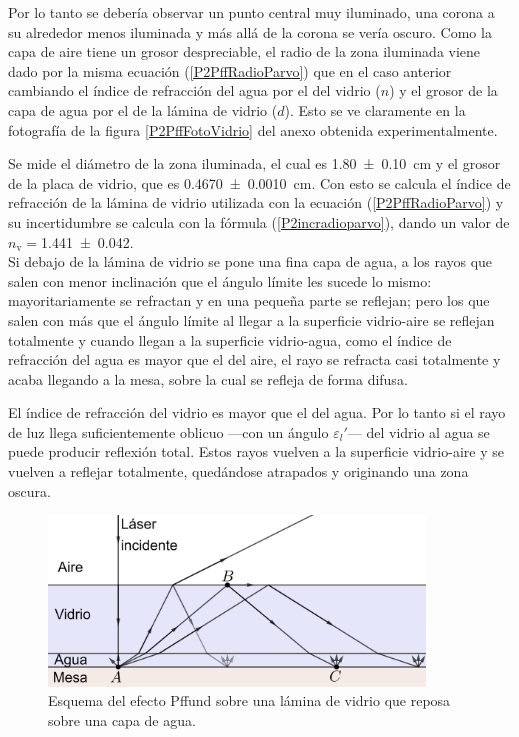 \documentclass[12pt]{article}
\numberwithin{table}{section}
\numberwithin{figure}{section}
\numberwithin{equation}{section}
\newcommand{\data}[3]{\SI{#1 \pm #2}{#3}}
\begin{document}
Por lo tanto se debería observar un punto central muy iluminado, una corona a su alrededor menos iluminada y más allá de la corona se vería oscuro. Como la capa de aire tiene un grosor despreciable, el radio de la zona iluminada viene dado por la misma ecuación (\ref{P2PffRadioParvo}) que en el caso anterior cambiando el índice de refracción del agua por el del vidrio ($n$) y el grosor de la capa de agua por el de la lámina de vidrio ($d$). Esto se ve claramente en la fotografía de la figura \ref{P2PffFotoVidrio} del anexo obtenida experimentalmente.

Se mide el diámetro de la zona iluminada, el cual es \data{1.80}{0.10}{cm} y el grosor de la placa de vidrio, que es \data{0.4670}{0.0010}{cm}. Con esto se calcula el índice de refracción de la lámina de vidrio utilizada con la ecuación (\ref{P2PffRadioParvo}) y su incertidumbre se calcula con la fórmula (\ref{P2incradioparvo}), dando un valor de $n_{\text{v}}=$\data{1.441}{0.042}{}.
\\

Si debajo de la lámina de vidrio se pone una fina capa de agua, a los rayos que salen con menor inclinación que el ángulo límite les sucede lo mismo: mayoritariamente se refractan y en una pequeña parte se reflejan; pero los que salen con más que el ángulo límite al llegar a la superficie vidrio-aire se reflejan totalmente y cuando llegan a la superficie vidrio-agua, como el índice de refracción del agua es mayor que el del aire, el rayo se refracta casi totalmente y acaba llegando a la mesa, sobre la cual se refleja de forma difusa.

El índice de refracción del vidrio es mayor que el del agua. Por lo tanto si el rayo de luz llega suficientemente oblicuo ---con un ángulo $\varepsilon_l'$--- del vidrio al agua se puede producir reflexión total. Estos rayos vuelven a la superficie vidrio-aire y se vuelven a reflejar totalmente, quedándose atrapados y originando una zona oscura.

\begin{figure}[!ht]
	\small \centering \sffamily
	\begin{center}
		\includegraphics[width=10cm]{P2PffAgrio.png}
		\caption{Esquema del efecto Pffund sobre una lámina de vidrio que reposa sobre una capa de agua.}
		\label{P2PffAgrio}
	\end{center}
\end{figure}
\end{document}
